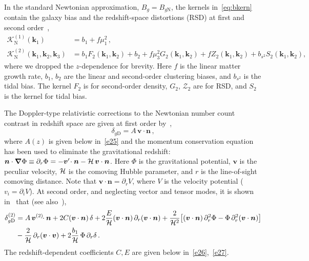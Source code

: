 In the standard Newtonian approximation, $B_g=B_{g{\mathrm{N}}}$, the kernels in~\eqref{eq:bkern} contain the galaxy bias and the redshift-space distortions (RSD) at first and second order~\cite{Bernardeau:2001qr, Karagiannis:2018jdt},
\begin{align}
\mathcal{K}^{(1)}_{\mathrm{N}}(\bm{k}_{1}) &= b_{1}+f\mu_{1}^{2}\,,  \label{e15} \\ 
{\mathcal{K}^{(2)}_{\mathrm{N}}}(\bm{k}_{1}, \bm{k}_{2},{\bm{k}_3}) &= b_{1}F_{2}(\bm{k}_{1}, \bm{k}_{2}) + b_{2} + f\mu_{3}^{2}G_{2}(\bm{k}_{1}, \bm{k}_{2}) +{fZ_2}(\bm{k}_{1}, \bm{k}_{2})
+ b_{s^{2}}S_{2}(\bm{k}_{1}, \bm{k}_{2}) , \label{k2n}
\end{align}
where we dropped the $z$-dependence for brevity. Here $f$ is the linear matter growth rate, $b_1$, $b_2$ are the linear and second-order clustering biases, and $b_{s^{2}}$ is the tidal bias. The kernel $F_2$ is for second-order density, $G_2$, $\mathcal{Z}_2$ are for RSD, and $S_2$ is the kernel for tidal bias.


The Doppler-type relativistic corrections to the Newtonian number count contrast in redshift space are  given at first order by~\cite{Bonvin:2011bg},
\begin{equation}
\delta_{g\mathrm{D}} =  {A}\,\bm{v}\cdot\bm{n}\,,\label{dg1}
\end{equation}
{where $A(z)$ is given below in~\eqref{e25} and the momentum conservation equation has been used to  eliminate the gravitational redshift: $\bm{n}\cdot\bm{\nabla}\Phi\equiv \partial_r \Phi = -\bm{v}'\!\cdot\bm{n}-\mathcal{H}\,\bm{v}\cdot\bm{n} $.} Here $\Phi$ is the gravitational potential, $\bm{v}$ is the peculiar velocity,  $\mathcal{H}$ is the comoving Hubble parameter, and $r$ is the line-of-sight comoving distance.
Note that $\bm{v}\cdot\bm{n}=\partial_r V$, where $V$ is the velocity potential ($v_i=\partial_iV$). 
At second order, and neglecting vector and tensor modes, it is shown in~\cite{Clarkson:2018dwn}  that (see also~\cite{DiDio:2018zmk}),
\begin{align}
\delta^{(2)}_{g{\mathrm{D}}}&= A\, \bm{v}^{(2)}\!\!\cdot\bm{n}+2{C}(\bm{v}\cdot\bm{n})\,\delta +2 \frac{{E}}{\mathcal{H}}(\bm{v}\cdot\bm{n})\,\partial_r(\bm{v}\cdot\bm{n})
+ \frac{2}{\mathcal{H}^2}\big[(\bm{v}\cdot\bm{n}) \,\partial_r^2\Phi-\Phi\, \partial_r^2 (\bm{v}\cdot\bm{n}) \big]
\nonumber\\ \label{eq:dgsecond}
& - \frac{2}{\mathcal{H}}\,\partial_r (\bm{v}\cdot\bm{v}) + 2 \frac{b_1}{\mathcal{H}}\,\Phi\, \partial_r\delta \,. 
\end{align}
The redshift-dependent coefficients $C,E$ are  given below in~\eqref{e26},~\eqref{e27}.


